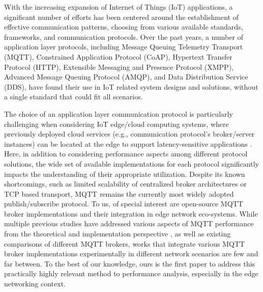 \documentclass[conference]{IEEEtran}
\begin{document}
With the increasing expansion of Internet of Things (IoT) applications, a significant number of
efforts has been centered around the establishment of effective communication patterns, choosing
from various available standards, frameworks, and communication protocols. Over the past years, a
number of application layer protocols, including Message Queuing Telemetry Transport (MQTT),
Constrained Application Protocol (CoAP), Hypertext Transfer Protocol (HTTP), Extensible Messaging
and Presence Protocol (XMPP),  Advanced Message Queuing Protocol (AMQP), and Data Distribution
Service (DDS), have found their use in IoT related system designs and solutions, without a single
standard that could fit all scenarios.

The choice of an application layer communication protocol is particularly challenging when considering IoT edge/cloud computing systems, where previously deployed cloud services (e.g., communication protocol's broker/server instances) can be located at the edge to support latency-sensitive applications \cite{jha2020iotsim, swamy2020empirical}. Here, in addition to considering performance aspects among different protocol solutions, the wide set of available implementations  for each protocol significantly impacts the understanding of their appropriate utilization. Despite its known shortcomings, such as limited scalability of centralized broker architectures or TCP based transport, MQTT remains the currently most widely adopted publish/subscribe protocol.  To us, of special interest are open-source MQTT broker implementations and their integration in edge network eco-systems. While multiple previous studies have addressed various aspects of MQTT performance from the theoretical and implementation perspective \cite{jukan2023lab}, as well as existing comparisons of different MQTT brokers, works that integrate various MQTT broker implementations experimentally in different network scenarios are few and far between. To the best of our knowledge, ours is the first paper to address this practically highly relevant method to performance analysis, especially in the edge networking context.
\end{document}
